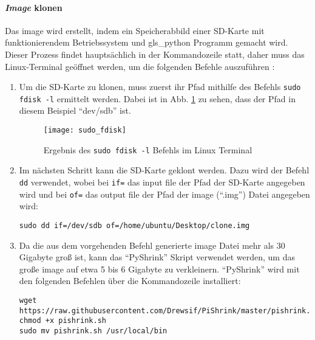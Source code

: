 \paragraph{\textit{Image} klonen}
Das \gls{image} wird erstellt, indem ein Speicherabbild einer SD-Karte mit funktionierendem Betriebssystem und \gls{gls_python} Programm gemacht wird. Dieser Prozess findet hauptsächlich in der Kommandozeile statt, daher muss das Linux-Terminal geöffnet werden, um die folgenden Befehle auszuführen \cite[vgl.][]{Jayanandana:2018}:
\begin{enumerate}

    \item Um die SD-Karte zu klonen, muss zuerst ihr Pfad mithilfe des Befehls \texttt{sudo fdisk -l} ermittelt werden. Dabei ist in Abb. \ref{fig:sudo_fdisk} zu sehen, dass der Pfad in diesem Beispiel \enquote{dev/sdb} ist.
    \begin{figure}[H]
        \centering
        \texttt{[image: sudo\_fdisk]}
        \caption{Ergebnis des \texttt{sudo fdisk -l} Befehls im Linux Terminal}
        \label{fig:sudo_fdisk}
    \end{figure}
    
    \item Im nächsten Schritt kann die SD-Karte geklont werden. Dazu wird der Befehl \texttt{dd} verwendet, wobei bei \texttt{if=} das input file \bzw der Pfad der SD-Karte angegeben wird und bei \texttt{of=} das output file \bzw der Pfad der \gls{image} (\enquote{.img}) Datei angegeben wird:
    \begin{verbatim}
sudo dd if=/dev/sdb of=/home/ubuntu/Desktop/clone.img
    \end{verbatim}

    \item Da die aus dem vorgehenden Befehl generierte \gls{image} Datei mehr als 30 Gigabyte groß ist, kann das \enquote{PyShrink} Skript verwendet werden, um das große  \gls{image} auf etwa 5 bis 6 Gigabyte zu verkleinern. \enquote{PyShrink} wird mit den folgenden Befehlen über die Kommandozeile installiert:
    \begin{verbatim}
wget https://raw.githubusercontent.com/Drewsif/PiShrink/master/pishrink.sh
chmod +x pishrink.sh
sudo mv pishrink.sh /usr/local/bin
    \end{verbatim}


\end{enumerate}
